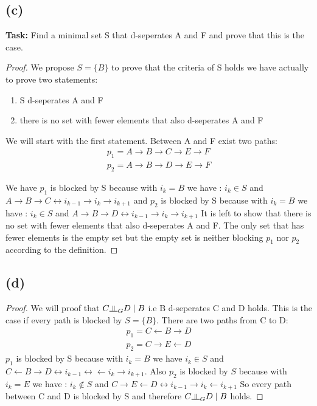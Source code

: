 \documentclass{article}
\newcommand{\dsep}{\rotatebox[origin=c]{90}{$\models$}}
\begin{document}
\subsection*{(c)}
\textbf{Task:} Find a minimal set S that d-seperates A and F and prove that this is the case.
\begin{proof}
    We propose $S= \{ B \}$ to prove that the criteria of S holds we have actually to prove two statements:
    \begin{enumerate}
        \item S d-seperates A and F
        \item there is no set with fewer elements that also d-seperates A and F
    \end{enumerate}
     
We will start with the first statement. Between A and F exist two paths:
\begin{align*}
    p_1 = A \rightarrow B \rightarrow C \rightarrow E \rightarrow F \\
    p_2 = A \rightarrow B \rightarrow D \rightarrow E \rightarrow F 
\end{align*}

We have $p_1$ is blocked by S because with $i_k = B$ we have : $i_k \in S$ and $A \rightarrow B \rightarrow C \leftrightarrow i_{k-1} \rightarrow i_k \rightarrow i_{k+1}$ and $p_2$ is blocked by S because with $i_k = B$ we have : $i_k \in S$ and $A \rightarrow B \rightarrow D \leftrightarrow i_{k-1} \rightarrow i_k \rightarrow i_{k+1}$
It is left to show that there is no set with fewer elements that also d-seperates A and F. The only set that has fewer elements is the empty set but the empty set is neither blocking $p_1$ nor $p_2$ according to the definition.
\end{proof}

\subsection*{(d)}
\begin{proof}
    
    We will proof that $C \dsep_G D \mid B$ i.e B d-seperates C and D holds. 
    This is the case if every path is blocked by $S=\{B\}$. There are two paths from C to D:
    \begin{align*}
        p_1 = C \leftarrow B \rightarrow D \\
        p_2 = C \rightarrow E \leftarrow D
    \end{align*}
    $p_1$ is blocked by S because with $i_k=B$ we have $i_k \in S$ and $C \leftarrow B \rightarrow D \leftrightarrow i_{k-1} \leftrightarrow \leftarrow i_k \rightarrow i_{k+1}$.
    Also $p_2$ is blocked by $S$ because with $i_k=E$ we have : $i_k \notin S$ and $C \rightarrow E \leftarrow D \leftrightarrow i_{k-1} \rightarrow i_k \leftarrow i_{k+1}$
    So every path between C and D is blocked by S and therefore $C \dsep_G D \mid B$ holds.
\end{proof}



\end{document}
